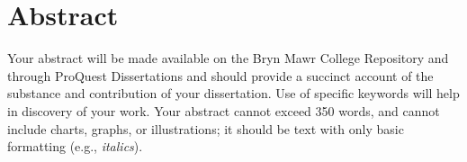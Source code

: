 \chapter*{Abstract}
\indent \indent Your abstract will be made available on the Bryn Mawr College Repository and
through ProQuest Dissertations and should provide a succinct account of the substance
and contribution of your dissertation. Use of specific keywords will help in discovery of
your work. Your abstract cannot exceed 350 words, and cannot include charts, graphs, or
illustrations; it should be text with only basic formatting (e.g., \textit{italics}).

